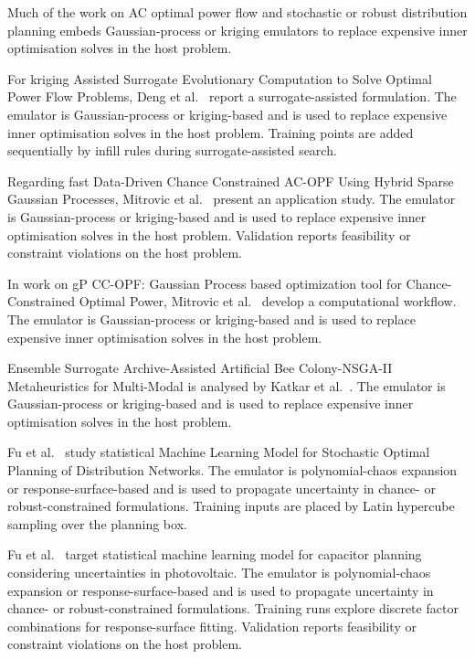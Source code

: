Much of the work on AC optimal power flow and stochastic or robust distribution planning embeds Gaussian-process or kriging emulators to replace expensive inner optimisation solves in the host problem.

For kriging Assisted Surrogate Evolutionary Computation to Solve Optimal Power Flow Problems, Deng et al.~\cite{Deng2020831} report a surrogate-assisted formulation. The emulator is Gaussian-process or kriging-based and is used to replace expensive inner optimisation solves in the host problem. Training points are added sequentially by infill rules during surrogate-assisted search.

Regarding fast Data-Driven Chance Constrained AC-OPF Using Hybrid Sparse Gaussian Processes, Mitrovic et al.~\cite{Mitrovic2023__2} present an application study. The emulator is Gaussian-process or kriging-based and is used to replace expensive inner optimisation solves in the host problem. Validation reports feasibility or constraint violations on the host problem.

In work on gP CC-OPF: Gaussian Process based optimization tool for Chance-Constrained Optimal Power, Mitrovic et al.~\cite{Mitrovic2023__3} develop a computational workflow. The emulator is Gaussian-process or kriging-based and is used to replace expensive inner optimisation solves in the host problem.

Ensemble Surrogate Archive-Assisted Artificial Bee Colony-NSGA-II Metaheuristics for Multi-Modal is analysed by Katkar et al.~\cite{Katkar2025}. The emulator is Gaussian-process or kriging-based and is used to replace expensive inner optimisation solves in the host problem.

Fu et al.~\cite{Fu20202904} study statistical Machine Learning Model for Stochastic Optimal Planning of Distribution Networks. The emulator is polynomial-chaos expansion or response-surface-based and is used to propagate uncertainty in chance- or robust-constrained formulations. Training inputs are placed by Latin hypercube sampling over the planning box.

Fu et al.~\cite{Fu2022} target statistical machine learning model for capacitor planning considering uncertainties in photovoltaic. The emulator is polynomial-chaos expansion or response-surface-based and is used to propagate uncertainty in chance- or robust-constrained formulations. Training runs explore discrete factor combinations for response-surface fitting. Validation reports feasibility or constraint violations on the host problem.

